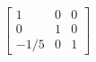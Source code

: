\documentclass{article}
\begin{document}
\thispagestyle{empty}


$$
\begin{bmatrix}1&0&0 \\ 0&1&0\\-1/5&0&1\end{bmatrix}
$$
\end{document}
